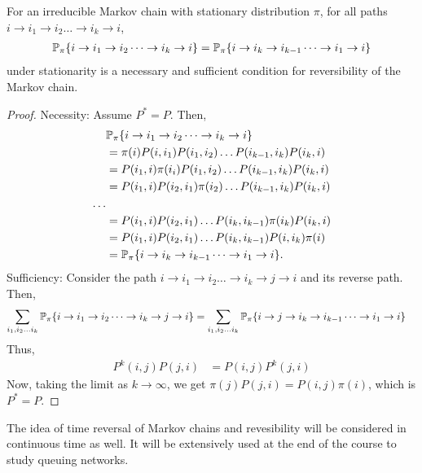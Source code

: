 \documentclass[all-lectures.tex]{subfiles}
\begin{document}
\begin{prop}
For an irreducible Markov chain with stationary distribution $\pi$,  for all paths $i\rightarrow i_1 \rightarrow i_2 \dots \rightarrow i_k \rightarrow i$,
\begin{align*}
\P_\pi\{i\rightarrow i_1 \rightarrow i_2 \dots \rightarrow i_k \rightarrow i\} = \P_\pi\{i \rightarrow i_k \rightarrow i_{k-1} \dots \rightarrow i_1 \rightarrow i\}
\end{align*}
under stationarity is a necessary and sufficient condition for reversibility of the Markov chain. 
\begin{proof}
Necessity: Assume $P^* = P$. Then, 
\begin{align*}
&\P_\pi\{i\rightarrow i_1 \rightarrow i_2 \dots \rightarrow i_k \rightarrow i\} \\
&= \pi(i)P(i,i_1)P(i_1,i_2)\dots P(i_{k-1},i_{k})P(i_k,i)\\
& = P(i_1,i)\pi(i_i) P(i_1,i_2)\dots P(i_{k-1},i_{k})P(i_k,i) \\
& = P(i_1,i)P(i_2,i_1)\pi(i_2) \dots P(i_{k-1},i_{k})P(i_k,i) \\
\dots \\
& = P(i_1,i)P(i_2,i_1) \dots P(i_{k},i_{k-1})\pi(i_k)P(i_k,i) \\
& = P(i_1,i)P(i_2,i_1) \dots P(i_{k},i_{k-1})P(i,i_k)\pi(i) \\
&= \P_\pi\{i \rightarrow i_k \rightarrow i_{k-1} \dots \rightarrow i_1 \rightarrow i\}.
\end{align*}
Sufficiency: Consider the path $i\rightarrow i_1 \rightarrow i_2 \dots \rightarrow i_k \rightarrow j\rightarrow i$ and its reverse path. Then, 
\begin{align*}
\sum_{i_1,i_2\dots i_k}\P_\pi\{i\rightarrow i_1 \rightarrow i_2 \dots \rightarrow i_k \rightarrow j \rightarrow i\} &= \sum_{i_1,i_2\dots i_k}\P_\pi\{i \rightarrow j \rightarrow i_k \rightarrow i_{k-1} \dots \rightarrow i_1 \rightarrow i\} 
\end{align*}
Thus, 
\begin{align*}
P^{k}(i,j)P(j,i) &= P(i,j)P^{k}(j,i)
\end{align*}
Now, taking the limit as $k\rightarrow \infty$, we get $\pi(j)P(j,i) = P(i,j)\pi(i)$, which is $P^* = P$.
\end{proof}
\end{prop}
The idea of time reversal of Markov chains and revesibility will be considered in continuous time as well. It will be extensively used at the end of the course to study queuing networks.
\end{document}
